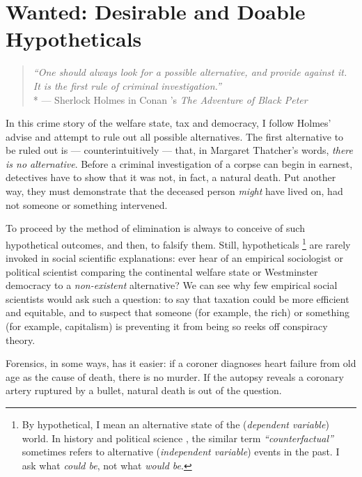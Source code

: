 
\chapter[Wanted]{Wanted: Desirable and Doable Hypotheticals} \label{chap:wanted}
	
\begin{quote}
	\emph{``One should always look for a possible alternative, and provide against it. It is the first rule of criminal investigation.''}\\*
	--- Sherlock Holmes in Conan \citeauthor{Doyle1904}'s \emph{The Adventure of Black Peter} \citeyearpar[567]{Doyle1904}
\end{quote}

In this crime story of the welfare state, tax and democracy, I follow Holmes' advise and attempt to rule out all possible alternatives. 
The first alternative to be ruled out is --- counterintuitively --- that, in Margaret Thatcher's words, \emph{there is no alternative}. 
Before a criminal investigation of a corpse can begin in earnest, detectives have to show that it was not, in fact, a natural death. 
Put another way, they must demonstrate that the deceased person \emph{might} have lived on, had not someone or something intervened. 


To proceed by the method of elimination is always to conceive of such hypothetical outcomes, and then, to falsify them. Still, hypotheticals
\footnote{
	By hypothetical, I mean an alternative state of the (\emph{dependent variable}) world. 
	In history \citep[recently reviewed by][]{Bunzl2004} and political science \citep[for a methodological appraisal, see][]{Fearon1991}, the similar term \emph{``counterfactual''} sometimes refers to alternative (\emph{independent variable}) events in the past. I ask what \emph{could be}, not what \emph{would be}.
}
are rarely invoked in social scientific explanations: ever hear of an empirical sociologist or political scientist comparing the continental welfare state \citep{Esping-Andersen-1990-aa} or Westminster democracy \citep{Lijphart-1999-aa} to a \emph{non-existent} alternative? 
We can see why few empirical social scientists would ask such a question: to say that taxation could be more efficient and equitable, and to suspect that someone (for example, the rich) or something (for example, capitalism) is preventing it from being so reeks off conspiracy theory. 

Forensics, in some ways, has it easier: if a coroner diagnoses heart failure from old age as the cause of death, there is no murder. 
If the autopsy reveals a coronary artery ruptured by a bullet, natural death is out of the question.

